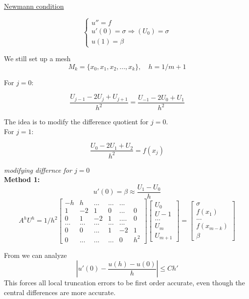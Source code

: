 \documentclass[10pt]{article}
\newcommand{\1}{\mathbb{1}}
\begin{document}
\underline{Newmann condition}

\[\begin{cases}
u'' = f\\
u'(0) = \sigma \Rightarrow (U_0) = \sigma\\
u(1) = \beta
\end{cases}\]

We still set up a mesh
\[M_k = \{x_0, x_1, x_2, ..., x_k\}, \quad h = 1/m+1\]

For $j = 0$:

\[\frac{U_{j-1} - 2U_j + U_{j+1}}{h^2} = \frac{U_{-1} - 2U_0 + U_1}{h^2}\]

The idea is to modify the difference quotient for $j=0$.\\

For $j = 1$: 

\[\frac{U_{0} - 2U_1 + U_{2}}{h^2} = f(x_j)\]

\textit{modifying differnce for $j = 0$}\\
\textbf{Method 1:}\\
\[u'(0) = \beta \approx \frac{U_1 - U_0}{h}\]
\[A^hU^h = 1/h^2 \begin{bmatrix}
    -h & h & ... & ... & ...\\
    1 & -2 & 1 & 0 & ... & 0\\
    0 & 1 & -2 & 1 & .... & 0\\
    ... & ... & ... & ... & ...\\
    0 & 0 & ... & 1 & -2 & 1\\
    0 & ... & ... & ... & 0 & h^2
\end{bmatrix}
\begin{bmatrix}
    U_0\\
    U-1\\
    ...\\
    U_m\\
    U_{m+1}
\end{bmatrix}
=
\begin{bmatrix}
\sigma\\
f(x_1)\\
...\\
f(x_{m-k})\\
\beta
\end{bmatrix}
\]

From we can analyze
\[|u'(0) - \frac{u(h) - u(0)}{h}| \leq Ch'\]
This forces all local truncation errors to be first order accurate, even though the central differences are more accurate.\\
\end{document}
